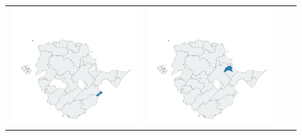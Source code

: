 \begin{figure}[p]
\begin{tabularx}{1\textwidth}{XXXX}
\includegraphics[width=1\linewidth]{images/ch6/loading/17}&
\includegraphics[width=1\linewidth]{images/ch6/loading/18}&

\end{tabularx}
\end{figure}
